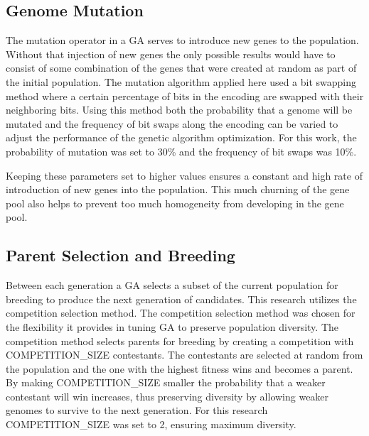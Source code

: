 \subsection{Genome Mutation}
The mutation operator in a GA serves to introduce new genes to the population. Without that injection of new genes the only possible results would have to consist of some combination of the genes that were created at random as part of the initial population. The mutation algorithm applied here used a bit swapping method where a certain percentage of bits in the encoding are swapped with their neighboring bits. Using this method both the probability that a genome will be mutated and the frequency of bit swaps along the encoding can be varied to adjust the performance of the genetic algorithm optimization. For this work, the probability of mutation was set to 30\% and the frequency of bit swaps was 10\%. 

Keeping these parameters set to higher values ensures a constant and high rate of introduction of new genes into the population. This much churning of the gene pool also helps to prevent too much homogeneity from developing in the gene pool. 

\subsection{Parent Selection and Breeding}
Between each generation a GA selects a subset of the current population for breeding to produce the next generation of candidates. This research utilizes the competition selection method. The competition selection method was chosen for the flexibility it provides in tuning GA to preserve population diversity. The competition method selects parents for breeding by creating a competition with COMPETITION\_SIZE contestants. The contestants are selected at random from the population and the one with the highest fitness wins and becomes a parent. By making COMPETITION\_SIZE smaller the probability that a weaker contestant will win increases, thus preserving diversity by allowing weaker genomes to survive to the next generation. For this research COMPETITION\_SIZE was set to 2, ensuring maximum diversity. 
